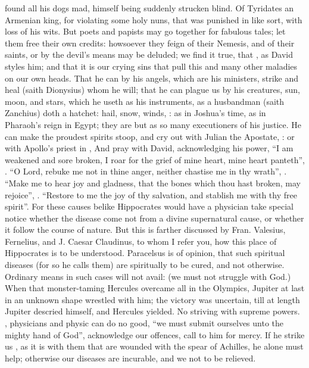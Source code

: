 found all his dogs mad, himself being suddenly strucken blind. Of Tyridates an
Armenian king, for violating some holy nuns, that was
punished in like sort, with loss of his wits. But poets and papists may go
together for fabulous tales; let them free their own credits: howsoever they
feign of their Nemesis, and of their saints, or by the devil's means may be
deluded; we find it true, that , as David styles him; and that it is our crying
sins that pull this and many other maladies on our own heads. That he can by
his angels, which are his ministers, strike and heal (saith
Dionysius) whom he will; that he can plague us by his
creatures, sun, moon, and stars, which he useth as his instruments, as a
husbandman (saith Zanchius) doth a hatchet: hail, snow, winds, \etc{}
: as in
Joshua's time, as in Pharaoh's reign in Egypt; they are but as so many
executioners of his justice. He can make the proudest spirits stoop, and cry
out with Julian the Apostate, : or with Apollo's priest in
\Chrysostom{},   And pray with David, acknowledging his power, \enquote{I
am weakened and sore broken, I roar for the grief of mine heart, mine heart
panteth}, \etc{} . \enquote{O Lord, rebuke me not in
thine anger, neither chastise me in thy wrath}, . \enquote{Make me to hear joy and gladness, that the bones which thou hast broken,
may rejoice}, . \enquote{Restore to me the joy
of thy salvation, and stablish me with thy free spirit}. For these causes
belike Hippocrates would have a physician take special
notice whether the disease come not from a divine supernatural cause, or
whether it follow the course of nature. But this is farther discussed by Fran.
Valesius, 
Fernelius, and J. Caesar Claudinus,
to whom I refer you, how this place of Hippocrates is to be understood.
Paracelsus is of opinion, that such spiritual diseases (for so he calls them)
are spiritually to be cured, and not otherwise. Ordinary means in such cases
will not avail:  (we must not struggle with
God.) When that monster-taming Hercules overcame all in the Olympics, Jupiter
at last in an unknown shape wrestled with him; the victory was uncertain, till
at length Jupiter descried himself, and Hercules yielded. No striving with
supreme powers. , physicians
and physic can do no good, \enquote{we must submit ourselves unto
the mighty hand of God}, acknowledge our offences, call to him for mercy. If he
strike us , as it is with them that
are wounded with the spear of Achilles, he alone must help; otherwise our
diseases are incurable, and we not to be relieved.


